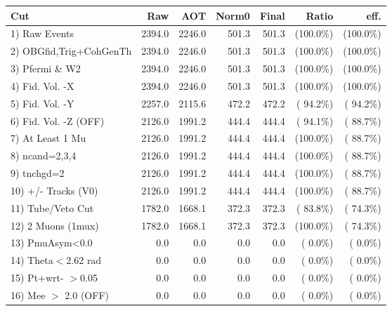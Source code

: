  \begin{table}[h!]\centering
 \begin{tabular}{||l||r|r|r|r|r|r||}
 \hline
 \hline
 Cut & Raw & AOT & Norm0 & Final & Ratio & eff.       \\
 \hline
  1) Raw Events           &       2394.0 &       2246.0 &        501.3 &        501.3 & (100.0\%) & (100.0\%) \\
  2) OBGfid,Trig+CohGenTh &       2394.0 &       2246.0 &        501.3 &        501.3 & (100.0\%) & (100.0\%) \\
  3) Pfermi \& W2         &       2394.0 &       2246.0 &        501.3 &        501.3 & (100.0\%) & (100.0\%) \\
  4) Fid. Vol. -X         &       2394.0 &       2246.0 &        501.3 &        501.3 & (100.0\%) & (100.0\%) \\
  5) Fid. Vol. -Y         &       2257.0 &       2115.6 &        472.2 &        472.2 & ( 94.2\%) & ( 94.2\%) \\
  6) Fid. Vol. -Z (OFF)   &       2126.0 &       1991.2 &        444.4 &        444.4 & ( 94.1\%) & ( 88.7\%) \\
  7) At Least 1 Mu        &       2126.0 &       1991.2 &        444.4 &        444.4 & (100.0\%) & ( 88.7\%) \\
  8) ncand=2,3,4          &       2126.0 &       1991.2 &        444.4 &        444.4 & (100.0\%) & ( 88.7\%) \\
  9) tnchgd=2             &       2126.0 &       1991.2 &        444.4 &        444.4 & (100.0\%) & ( 88.7\%) \\
 10) +/- Tracks (V0)      &       2126.0 &       1991.2 &        444.4 &        444.4 & (100.0\%) & ( 88.7\%) \\
 11) Tube/Veto Cut        &       1782.0 &       1668.1 &        372.3 &        372.3 & ( 83.8\%) & ( 74.3\%) \\
 12) 2 Muons (1mux)       &       1782.0 &       1668.1 &        372.3 &        372.3 & (100.0\%) & ( 74.3\%) \\
 13) PmuAsym<0.0          &          0.0 &          0.0 &          0.0 &          0.0 & (  0.0\%) & (  0.0\%) \\
 14) Theta$<$2.62 rad     &          0.0 &          0.0 &          0.0 &          0.0 & (  0.0\%) & (  0.0\%) \\
 15) Pt+wrt- $>$0.05      &          0.0 &          0.0 &          0.0 &          0.0 & (  0.0\%) & (  0.0\%) \\
 16) Mee $>$ 2.0  (OFF)   &          0.0 &          0.0 &          0.0 &          0.0 & (  0.0\%) & (  0.0\%) \\

\end{tabular}
\end{table}
